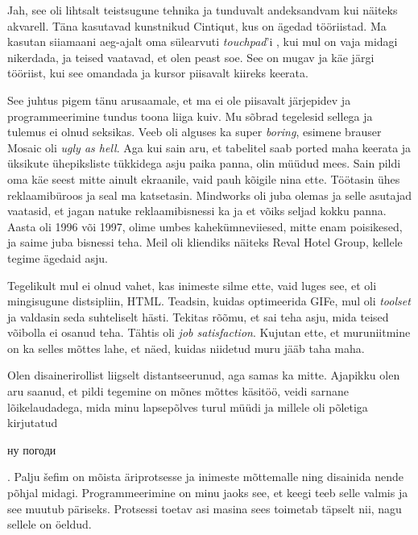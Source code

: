 
Jah, see oli lihtsalt teistsugune tehnika ja tunduvalt andeksandvam 
kui näiteks akvarell. Täna kasutavad kunstnikud 
Cintiqut, kus on ägedad tööriistad. Ma kasutan siiamaani aeg-ajalt oma 
sülearvuti \emph{touchpad}'i , 
kui mul on vaja midagi nikerdada, ja teised
vaatavad, et olen peast soe. See on mugav ja käe järgi tööriist, kui see 
omandada ja kursor piisavalt kiireks keerata.

 
See juhtus pigem tänu arusaamale, et ma ei ole piisavalt 
järjepidev ja programmeerimine tundus toona liiga kuiv. Mu sõbrad 
tegelesid sellega ja tulemus ei olnud seksikas. Veeb oli alguses ka super 
\emph{boring}, esimene brauser Mosaic oli \emph{ugly 
as hell}. Aga kui sain aru, et tabelitel saab ported maha keerata ja 
üksikute ühepiksliste tükkidega asju paika panna, 
olin müüdud mees. Sain pildi oma käe seest mitte ainult
ekraanile, vaid pauh kõigile nina ette. 
Töötasin ühes reklaamibüroos ja seal ma katsetasin. 
Mindworks oli juba olemas ja selle asutajad vaatasid, et jagan 
natuke reklaamibisnessi ka ja et võiks seljad kokku panna. Aasta 
oli 1996 või 1997, olime umbes kahekümneviiesed, mitte enam
poisikesed, ja saime juba bisnessi teha.
Meil oli kliendiks näiteks Reval Hotel Group, kellele tegime ägedaid asju.


Tegelikult mul ei olnud vahet, kas inimeste silme ette, vaid luges
see, et oli mingisugune distsipliin, HTML. Teadsin, kuidas 
optimeerida GIFe, mul oli \emph{toolset} ja valdasin seda 
suhteliselt hästi. Tekitas rõõmu, et sai teha asju, mida 
teised võibolla ei osanud teha. Tähtis oli \emph{job satisfaction}. Kujutan 
ette, et muruniitmine on ka selles mõttes lahe, et näed, kuidas 
niidetud muru jääb taha maha.


Olen disainerirollist liigselt distantseerunud, aga samas ka
mitte. Ajapikku olen aru saanud, et pildi tegemine on mõnes mõttes 
käsitöö, veidi sarnane lõikelaudadega, mida minu lapsepõlves 
turul müüdi ja millele oli põletiga kirjutatud \begin{russian}ну 
погоди\end{russian}. Palju šefim on mõista
äriprotsesse ja inimeste mõttemalle ning 
disainida nende põhjal midagi. Programmeerimine on minu jaoks see, et keegi 
teeb selle valmis ja see muutub 
päriseks. Protsessi toetav asi masina sees toimetab täpselt nii, nagu 
sellele on öeldud. 

